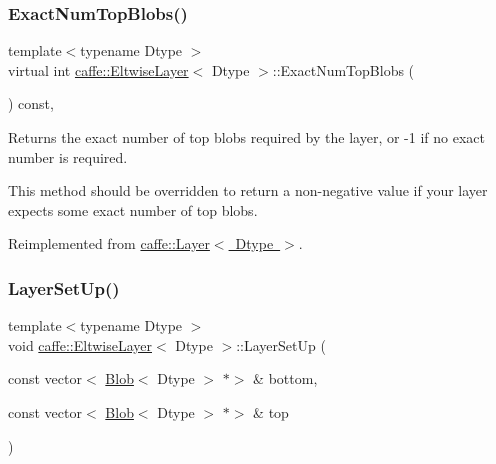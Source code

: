 \mbox{\label{classcaffe_1_1_eltwise_layer_a60ae4a38cade1cc7f6111e51cabb441b}} 
\subsubsection{\texorpdfstring{Exact\+Num\+Top\+Blobs()}{ExactNumTopBlobs()}\hspace{0.1cm}{\footnotesize\ttfamily [2/2]}}
{\footnotesize\ttfamily template$<$typename Dtype $>$ \\
virtual int \mbox{\hyperlink{classcaffe_1_1_eltwise_layer}{caffe\+::\+Eltwise\+Layer}}$<$ Dtype $>$\+::Exact\+Num\+Top\+Blobs (\begin{DoxyParamCaption}{ }\end{DoxyParamCaption}) const\hspace{0.3cm}{\ttfamily [inline]}, {\ttfamily [virtual]}}



Returns the exact number of top blobs required by the layer, or -\/1 if no exact number is required. 

This method should be overridden to return a non-\/negative value if your layer expects some exact number of top blobs. 

Reimplemented from \mbox{\hyperlink{classcaffe_1_1_layer_a64e2ca72c719e4b2f1f9216ccfb0d37f}{caffe\+::\+Layer$<$ Dtype $>$}}.

\mbox{\label{classcaffe_1_1_eltwise_layer_a02516b6e7b1b0d032e586785687bcabc}} 
\subsubsection{\texorpdfstring{Layer\+Set\+Up()}{LayerSetUp()}\hspace{0.1cm}{\footnotesize\ttfamily [1/2]}}
{\footnotesize\ttfamily template$<$typename Dtype $>$ \\
void \mbox{\hyperlink{classcaffe_1_1_eltwise_layer}{caffe\+::\+Eltwise\+Layer}}$<$ Dtype $>$\+::Layer\+Set\+Up (\begin{DoxyParamCaption}\item[{const vector$<$ \mbox{\hyperlink{classcaffe_1_1_blob}{Blob}}$<$ Dtype $>$ $\ast$$>$ \&}]{bottom,  }\item[{const vector$<$ \mbox{\hyperlink{classcaffe_1_1_blob}{Blob}}$<$ Dtype $>$ $\ast$$>$ \&}]{top }\end{DoxyParamCaption})\hspace{0.3cm}{\ttfamily [virtual]}}



